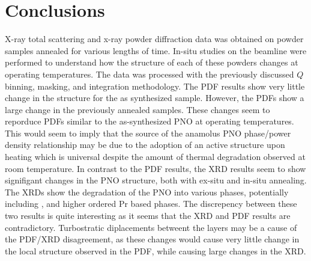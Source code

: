 \section{Conclusions}
X-ray total scattering and x-ray powder diffraction data was obtained on  powder samples annealed for various lengths of time.
In-situ studies on the beamline were performed to understand how the structure of each of these powders changes at operating temperatures.
The data was processed with the previously discussed $Q$ binning, masking, and integration methodology.
The PDF results show very little change in the structure for the as synthesized sample.
However, the PDFs show a large change in the previously annealed samples.
These changes seem to reporduce PDFs similar to the as-synthesized PNO at operating temperatures.
This would seem to imply that the source of the anamolus PNO phase/power density relationship may be due to the adoption of an active structure upon heating which is universal despite the amount of thermal degradation observed at room temperature.
In contrast to the PDF results, the XRD results seem to show signifigant changes in the PNO structure, both with ex-situ and in-situ annealing.
The XRDs show the degradation of the PNO into various phases, potentially including , and higher ordered Pr based phases.
The discrepency between these two results is quite interesting as it seems that the XRD and PDF results are contradictory.
Turbostratic diplacements betweent the layers may be a cause of the PDF/XRD disagreement, as these changes would cause very little change in the local structure observed in the PDF, while causing large changes in the XRD.
